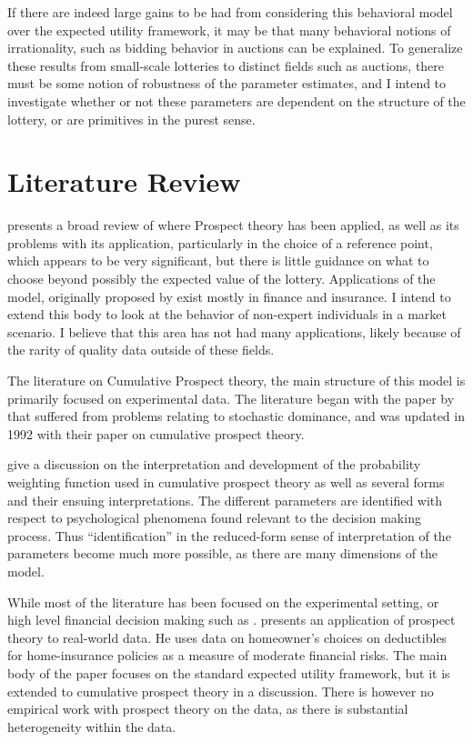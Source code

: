 \documentclass[12pt]{paper}
\begin{document}
If there are indeed large gains to be had from considering this
behavioral model over the expected utility framework, it may be that
many behavioral notions of irrationality, such as bidding behavior in
auctions can be explained. To generalize these results from
small-scale lotteries to distinct fields such as auctions, there must
be some notion of robustness of the parameter estimates, and I intend
to investigate whether or not these parameters are dependent on the
structure of the lottery, or are primitives in the purest sense. 



\section{Literature Review}

\cite*{LitReview} presents a broad review of where Prospect theory has
been applied, as well as its problems with its application,
particularly in the choice of a reference point, which appears to be
very significant, but there is little guidance on what to choose
beyond possibly the expected value of the lottery. Applications of the
model, originally proposed by \cite*{Kahn} exist mostly in finance and
insurance. I intend to extend this body to look at the behavior of
non-expert individuals in a market scenario. I believe that this area
has not had many applications, likely because of the rarity of quality
data outside of these fields.

The literature on Cumulative Prospect theory, the main structure of
this model is primarily focused on experimental data. The literature
began with the paper by \cite*{ProspectTheory} that suffered from
problems relating to stochastic dominance, and was updated in 1992
with their paper on cumulative prospect theory. 

\cite*{GONZALEZ1999129} give a discussion on the interpretation and
development of the probability weighting function used in cumulative
prospect theory as well as several forms and their ensuing
interpretations. The different parameters are identified with respect
to psychological phenomena found relevant to the decision making
process. Thus ``identification'' in the reduced-form sense of
interpretation of the parameters become much more possible, as there
are many dimensions of the model.

While most of the literature has been focused on the experimental
setting, or high level financial decision making such as \cite*{Thaler1995}.
\cite*{Sydnor2010} presents an application of prospect theory to real-world
data. He uses data on homeowner's choices on deductibles for
home-insurance policies as a measure of moderate financial risks. The
main body of the paper focuses on the standard expected utility
framework, but it is extended to cumulative prospect theory in a
discussion. There is however no empirical work with prospect theory on
the data, as there is substantial heterogeneity within the data.
\end{document}
